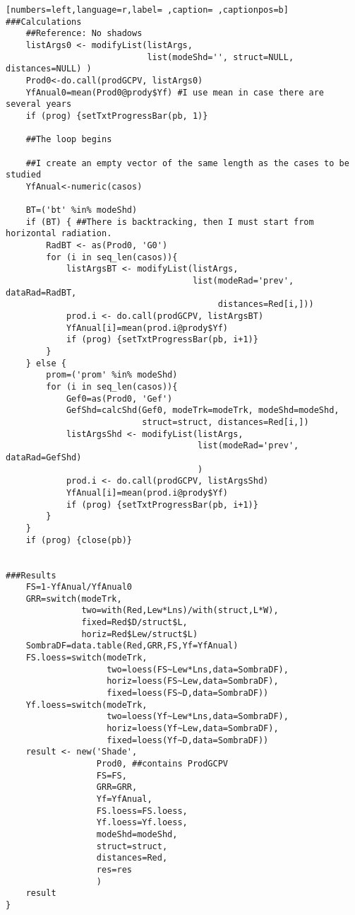\begin{lstlisting}[numbers=left,language=r,label= ,caption= ,captionpos=b]
###Calculations	
    ##Reference: No shadows	
    listArgs0 <- modifyList(listArgs,
                            list(modeShd='', struct=NULL, distances=NULL) )
    Prod0<-do.call(prodGCPV, listArgs0)
    YfAnual0=mean(Prod0@prody$Yf) #I use mean in case there are several years
    if (prog) {setTxtProgressBar(pb, 1)}

    ##The loop begins

    ##I create an empty vector of the same length as the cases to be studied
    YfAnual<-numeric(casos) 

    BT=('bt' %in% modeShd)
    if (BT) { ##There is backtracking, then I must start from horizontal radiation.
        RadBT <- as(Prod0, 'G0')
        for (i in seq_len(casos)){
            listArgsBT <- modifyList(listArgs,
                                     list(modeRad='prev', dataRad=RadBT,
                                          distances=Red[i,]))
            prod.i <- do.call(prodGCPV, listArgsBT)
            YfAnual[i]=mean(prod.i@prody$Yf)
            if (prog) {setTxtProgressBar(pb, i+1)}
        }
    } else {
        prom=('prom' %in% modeShd)
        for (i in seq_len(casos)){
            Gef0=as(Prod0, 'Gef')
            GefShd=calcShd(Gef0, modeTrk=modeTrk, modeShd=modeShd,
                           struct=struct, distances=Red[i,])
            listArgsShd <- modifyList(listArgs,
                                      list(modeRad='prev', dataRad=GefShd)
                                      )
            prod.i <- do.call(prodGCPV, listArgsShd)
            YfAnual[i]=mean(prod.i@prody$Yf)
            if (prog) {setTxtProgressBar(pb, i+1)}
        }
    }
    if (prog) {close(pb)}


###Results
    FS=1-YfAnual/YfAnual0
    GRR=switch(modeTrk,
               two=with(Red,Lew*Lns)/with(struct,L*W),
               fixed=Red$D/struct$L,
               horiz=Red$Lew/struct$L)
    SombraDF=data.table(Red,GRR,FS,Yf=YfAnual)
    FS.loess=switch(modeTrk,
                    two=loess(FS~Lew*Lns,data=SombraDF),
                    horiz=loess(FS~Lew,data=SombraDF),
                    fixed=loess(FS~D,data=SombraDF))
    Yf.loess=switch(modeTrk,
                    two=loess(Yf~Lew*Lns,data=SombraDF),
                    horiz=loess(Yf~Lew,data=SombraDF),
                    fixed=loess(Yf~D,data=SombraDF))
    result <- new('Shade',
                  Prod0, ##contains ProdGCPV
                  FS=FS,
                  GRR=GRR,
                  Yf=YfAnual,
                  FS.loess=FS.loess,
                  Yf.loess=Yf.loess,
                  modeShd=modeShd,
                  struct=struct,
                  distances=Red,
                  res=res
                  )
    result
}
\end{lstlisting}

